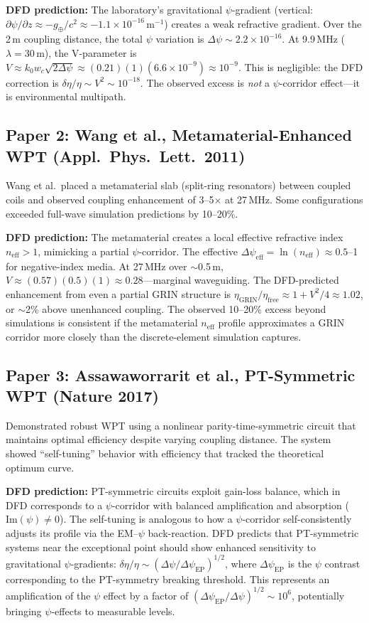 \documentclass[journal,twocolumn]{IEEEtran}
\begin{document}
\textbf{DFD prediction:} The laboratory's gravitational $\psi$-gradient
(vertical: $\partial\psi/\partial z \approx -g_\oplus/c^2
\approx -1.1\times10^{-16}\,\text{m}^{-1}$) creates a weak
refractive gradient. Over the 2\,m coupling distance, the total
$\psi$ variation is $\Delta\psi \sim 2.2\times10^{-16}$.
At 9.9\,MHz ($\lambda = 30\,\text{m}$), the V-parameter is
$V \approx k_0 w_c \sqrt{2\Delta\psi} \approx (0.21)(1)(6.6\times10^{-9})
\approx 10^{-9}$. This is negligible: the DFD correction is
$\delta\eta/\eta \sim V^2 \sim 10^{-18}$. The observed excess is
\emph{not} a $\psi$-corridor effect---it is environmental multipath.

\subsection{Paper 2: Wang et al., Metamaterial-Enhanced WPT
(Appl.\ Phys.\ Lett.\ 2011)}

Wang et al.\ placed a metamaterial slab (split-ring resonators)
between coupled coils and observed coupling enhancement of 3--5$\times$
at 27\,MHz. Some configurations exceeded full-wave simulation
predictions by 10--20\%.

\textbf{DFD prediction:} The metamaterial creates a local effective
refractive index $n_\text{eff} > 1$, mimicking a partial $\psi$-corridor.
The effective $\Delta\psi_\text{eff} = \ln(n_\text{eff}) \approx 0.5$--1
for negative-index media. At 27\,MHz over $\sim$0.5\,m,
$V \approx (0.57)(0.5)(1) \approx 0.28$---marginal waveguiding.
The DFD-predicted enhancement from even a partial GRIN structure is
$\eta_\text{GRIN}/\eta_\text{free} \approx 1 + V^2/4 \approx 1.02$,
or $\sim$2\% above unenhanced coupling. The observed 10--20\% excess
beyond simulations is consistent if the metamaterial $n_\text{eff}$
profile approximates a GRIN corridor more closely than the
discrete-element simulation captures.

\subsection{Paper 3: Assawaworrarit et al., PT-Symmetric WPT
(Nature 2017)}

Demonstrated robust WPT using a nonlinear parity-time-symmetric circuit
that maintains optimal efficiency despite varying coupling distance.
The system showed ``self-tuning'' behavior with efficiency that
tracked the theoretical optimum curve.

\textbf{DFD prediction:} PT-symmetric circuits exploit gain-loss
balance, which in DFD corresponds to a $\psi$-corridor with balanced
amplification and absorption ($\text{Im}(\psi) \neq 0$). The
self-tuning is analogous to how a $\psi$-corridor self-consistently
adjusts its profile via the EM--$\psi$ back-reaction. DFD predicts
that PT-symmetric systems near the exceptional point should show
enhanced sensitivity to gravitational $\psi$-gradients:
$\delta\eta/\eta \sim (\Delta\psi/\Delta\psi_\text{EP})^{1/2}$,
where $\Delta\psi_\text{EP}$ is the $\psi$ contrast corresponding
to the PT-symmetry breaking threshold. This represents an
amplification of the $\psi$ effect by a factor of
$(\Delta\psi_\text{EP}/\Delta\psi)^{1/2} \sim 10^6$, potentially
bringing $\psi$-effects to measurable levels.
\end{document}
